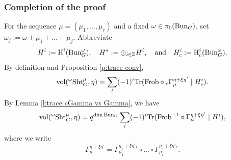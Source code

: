\documentclass[reqno]{amsart}
\numberwithin{equation}{subsection}
\theoremstyle{definition}
\def\ZZ{\mathbb{Z}}
\newcommand{\Bun}{\textup{Bun}}
\newcommand\Frob{\textup{Frob}}
\newcommand\Sht{\textup{Sht}}
\newcommand{\Tr}{\textup{Tr}}
\newcommand{\vol}{\textup{vol}}
\newcommand\op{\oplus}
\renewcommand\c\circ
\newcommand{\cohog}[2]{\textup{H}^{#1}({#2})}     %
\newcommand{\cohoc}[2]{\textup{H}_{c}^{#1}({#2})}     %
\newcommand{\om}{\omega}
\newcommand{\ol}[1]{\overline{#1}}
\begin{document}
\subsubsection{Completion of the proof}\label{sssec:split-completion}
For the sequence $\mu = (\mu_1, \ldots, \mu_r)$ and a fixed $\omega \in \pi_0(\Bun_G)$, set $\omega_j :=\omega + \ol\mu_1 + \ldots + \ol\mu_j$. Abbreviate 
\[
H^{i}:=\cohog{i}{\Bun_{G}^{\omega}}, \quad H^{*}:=\op_{i\in \ZZ}H^{i}, \quad \text{and} \quad H_{c}^{i}:=\cohoc{i}{\Bun_{G}^{\omega}}.
\]
By definition and Proposition \ref{p:trace conv},
\begin{equation}\label{alt trace Hc}
\vol({}^\om\Sht_G^\mu, \eta)  = \sum_{i}(-1)^{i}\Tr(\Frob\c {}_c\Gamma^{\eta + \xi \eta'}_\mu \mid H^{i}_{c}).
\end{equation}
By Lemma \ref{l:trace cGamma vs Gamma}, we have
\begin{equation}\label{alt trace H}
    \vol({}^\om\Sht_G^\mu, \eta)  =q^{\dim\Bun_G} \sum_{i}(-1)^{i}\Tr(\Frob^{-1}\c\Gamma^{\eta + \xi \eta'}_\mu \mid H^{i}),
\end{equation}
where we write
\[
\Gamma^{ \eta + \xi \eta'}_{\mu} = \Gamma^{ \eta_1 + \xi \eta'_1}_{\mu_1}\circ \ldots \circ \Gamma^{ \eta_r + \xi \eta'_r}_{\mu_r}.
\]



\end{document}

